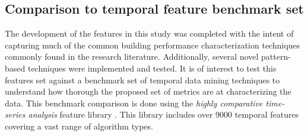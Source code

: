 \subsection{Comparison to temporal feature benchmark set}
\label{sec:hctsa_benchmark}

The development of the features in this study was completed with the intent of capturing much of the common building performance characterization techniques commonly found in the research literature. Additionally, several novel pattern-based techniques were implemented and tested. It is of interest to test this features set against a benchmark set of temporal data mining techniques to understand how thorough the proposed set of metrics are at characterizing the data. This benchmark comparison is done using the \emph{highly comparative time-series analysis} feature library \cite{Fulcher_2013}. This library includes over 9000 temporal features covering a vast range of algorithm types.

